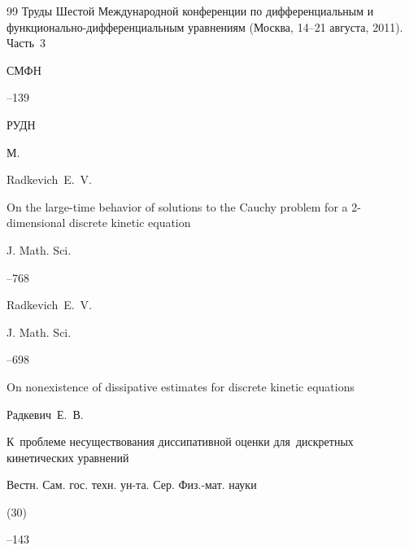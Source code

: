 \begin{thebibliography}{99}
\inbook Труды Шестой Международной конференции по дифференциальным и функционально-дифференциальным уравнениям \rm (Москва, 14--21 августа, 2011). Часть~3

\serial СМФН



--139

\publ РУДН

\publaddr М.


\transl

\by Radkevich~E.~V.

\paper On the large-time behavior of solutions to the Cauchy problem for a 2-dimensional discrete kinetic equation

\jour J. Math. Sci.




--768






\by Radkevich~E.~V.


\jour J. Math. Sci.




–698 

\paper On nonexistence of dissipative estimates for discrete kinetic equations






\by Радкевич~Е.~В.

\paper К~проблеме несуществования диссипативной оценки для~дискретных кинетических уравнений

\jour Вестн. Сам. гос. техн. ун-та. Сер. Физ.-мат. науки


(30)

--143



\end{thebibliography}
